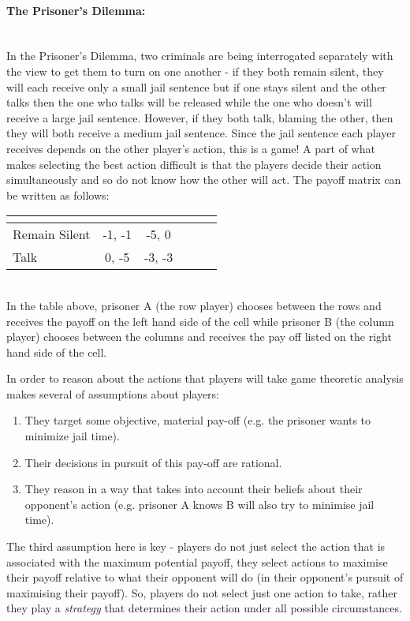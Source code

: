 \documentclass[11pt]{article}
\newcommand*{\np}{\par\noindent\newline}
\begin{document}
\paragraph{The Prisoner's Dilemma:}\mbox{}\\
In the Prisoner's Dilemma, two criminals are being interrogated
separately with the view to get them to turn on one another - if they both
remain silent, they will each receive only a small jail sentence but if one
stays silent and the other talks then the one who talks will be released while
the one who doesn't will receive a large jail sentence. However, if they both
talk, blaming the other, then they will both receive a medium jail sentence.
Since the jail sentence each player receives depends on the other player's
action, this is a game! A part of what makes selecting the best action
difficult is that the players decide their action simultaneously and so do not
know how the other will act. The payoff matrix can be written as follows:
\begin{center}
   \begin{tabular}{|l||*{5}{c|}}\hline
	\label{prisoner_payoff}
	\backslashbox{Prisoner A}{Prisoner B}
	&\makebox[7em]{Remain Silent}&\makebox[7em]{Talk}\\\hline\hline
	Remain Silent & -1, -1 & -5, 0\\\hline
	Talk & 0, -5 & -3, -3 \\\hline
	\end{tabular}
\end{center}\mbox{}\\
In the table above, prisoner A (the row player) chooses between the rows and
receives the payoff on the left hand side of the cell while prisoner B (the
column player) chooses between the columns and receives the pay off listed on
the right hand side of the cell.
\np In order to reason about the actions that players will take game theoretic
analysis makes several of assumptions about players:
\begin{enumerate}
    \item They target some objective, material pay-off (e.g. the prisoner wants
    to minimize jail time).
    \item Their decisions in pursuit of this pay-off are rational.
    \item They reason in a way that takes into account their beliefs about
    their opponent's action (e.g. prisoner A knows B will also try to minimise
    jail time). 
\end{enumerate}
\cite{osborne_course_1994}
\np The third assumption here is key - players do not just select the action
that is associated with the maximum potential payoff, they select actions to
maximise their payoff relative to what their opponent will do (in their
opponent's pursuit of maximising their payoff). So, players do not select just
one action to take, rather they play a \textit{strategy} that determines their
action under all possible circumstances.
\end{document}

